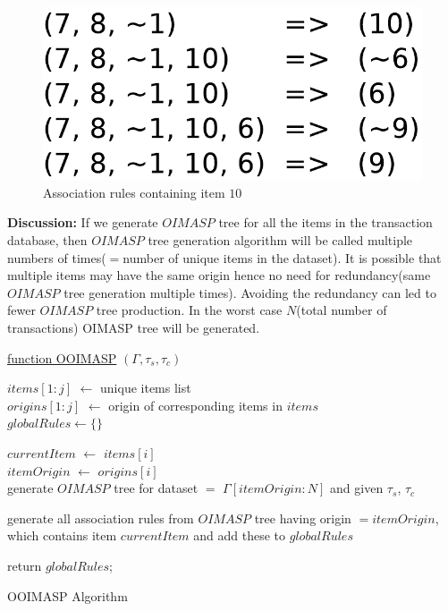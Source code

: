 \documentclass[review]{elsarticle}
\begin{document}
\begin{figure}
\begin{center}
\includegraphics[scale=0.35]{pdf/arules10}
\end{center}
\caption{Association rules containing item $ 10 $}
\label{Fig 10}
\end{figure}

\textbf{Discussion:} If we generate $ OIMASP $ tree for all the items in the transaction database, then $ OIMASP $ tree generation algorithm will be called multiple numbers of times($ = $number of unique items in the dataset). It is possible that multiple items may have the same origin hence no need for redundancy(same $ OIMASP $ tree generation multiple times). Avoiding the redundancy can led to fewer $ OIMASP $ tree production. In the worst case $ N $(total number of transactions) OIMASP tree will be generated.

\begin{algorithm}

    \underline{function OOIMASP} $ (\Gamma, \tau _{s}, \tau _{c}) $\;
       
    $ items[1:j] $ $ \leftarrow $ unique items list \\
    $ origins[1:j] $ $ \leftarrow $ origin of corresponding items in $ items $ \\       
    $ globalRules \leftarrow \lbrace \rbrace $
       
	  {
		$ currentItem $ $ \leftarrow $ $ items[i] $ \\
		$ itemOrigin $ $ \leftarrow $ $ origins[i] $ \\
			  	
      	  {
            generate $ OIMASP $ tree for dataset $ = $ $ \Gamma[itemOrigin:N] $ and given $ \tau _{s} $, $ 				\tau _{c} $
          }	
          
		generate all association rules from $ OIMASP $ tree having origin $ = itemOrigin $, which contains 			item $ currentItem $ and add these to $ globalRules $
	  }
	          		
	return $ globalRules $;      
    \caption{OOIMASP Algorithm}
\end{algorithm}
\end{document}
